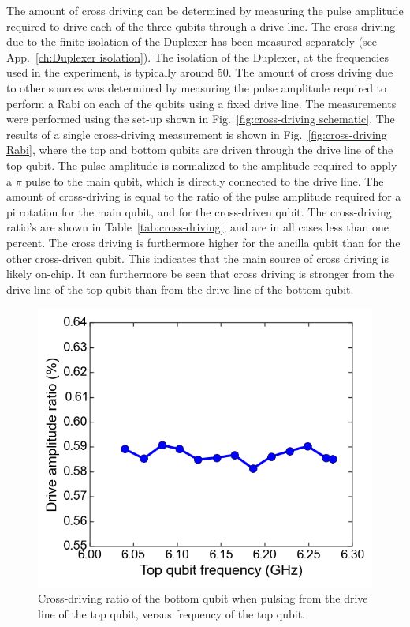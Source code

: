       The amount of cross driving can be determined by measuring the pulse amplitude required to drive each of the three qubits through a drive line. The cross driving due to the finite isolation of the Duplexer has been measured separately (see App.~\ref{ch:Duplexer isolation}). The isolation of the Duplexer, at the frequencies used in the experiment, is typically around \SI{50}{\dBm}. The amount of cross driving due to other sources was determined by measuring the pulse amplitude required to perform a Rabi on each of the qubits using a fixed drive line. The measurements were performed using the set-up shown in Fig.~\ref{fig:cross-driving schematic}. The results of a single cross-driving measurement is shown in Fig.~\ref{fig:cross-driving Rabi}, where the top and bottom qubits are driven through the drive line of the top qubit. The pulse amplitude is normalized to the amplitude required to apply a $\pi$ pulse to the main qubit, which is directly connected to the drive line. The amount of cross-driving is equal to the ratio of the pulse amplitude required for a pi rotation for the main qubit, and for the cross-driven qubit. The cross-driving ratio's are shown in Table~\ref{tab:cross-driving}, and are in all cases less than one percent. The cross driving is furthermore higher for the ancilla qubit than for the other cross-driven qubit. This indicates that the main source of cross driving is likely on-chip. It can furthermore be seen that cross driving is stronger from the drive line of the top qubit than from the drive line of the bottom qubit.

      \begin{figure}
        \begin{center}
        \vspace{-30pt}
          \includegraphics[width=\textwidth]{Figures/Exploring frequency re-use/cross-driving_vs_top_frequency.png}
        \end{center}
        \vspace{-20 pt}
        \caption{Cross-driving ratio of the bottom qubit when pulsing from the drive line of the top qubit, versus frequency of the top qubit. }
        \label{fig:cross-driving versus top frequency}
      \end{figure}

